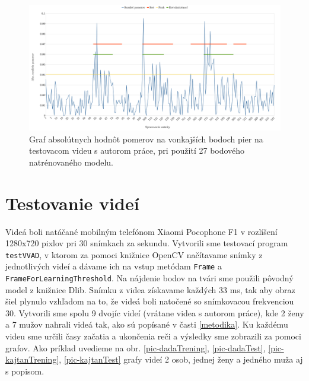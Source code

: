 \begin{figure}[H]
	\begin{center}
		\includegraphics[width=\textwidth]{pics/grafNovehoModeluVonTesting.png}
		\caption{Graf absolútnych hodnôt pomerov na vonkajších bodoch pier na testovacom videu s autorom práce, pri použití 27 bodového natrénovaného modelu.}
		\label{pic-grafNovehoModeluVonTesting}
	\end{center}
\end{figure}

\section{Testovanie videí}
Videá boli natáčané mobilným telefónom Xiaomi Pocophone F1 v rozlíšení 1280x720 pixlov pri 30 snímkach za sekundu. 
Vytvorili sme testovací program \texttt{testVVAD}, v ktorom za pomoci knižnice OpenCV načítavame snímky z jednotlivých videí a dávame ich na vstup metódam \texttt{Frame} a \texttt{Fra\-me\-For\-Lear\-ning\-Threshold}.
Na nájdenie bodov na tvári sme použili pôvodný model z knižnice Dlib.
Snímku z videa získavame každých 33 ms, tak aby obraz šiel plynulo vzhľadom na to, že videá boli natočené so snímkovacou frekvenciou 30.
Vytvorili sme spolu 9 dvojíc videí (vrátane videa s autorom práce), kde 2 ženy a 7 mužov nahrali videá tak, ako sú popísané v časti \ref{metodika}.
Ku každému videu sme určili časy začatia a ukončenia reči a výsledky sme zobrazili za pomoci grafov. 
Ako príklad uvedieme na obr. \ref{pic-dadaTrening}, \ref{pic-dadaTest}, \ref{pic-kajtanTrening}, \ref{pic-kajtanTest}  grafy videí 2 osob, jednej ženy a jedného muža aj s popisom.

